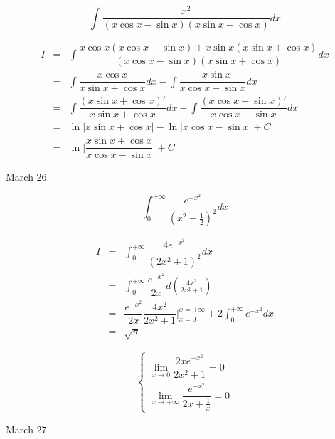 \begin{example}[][Exam: 29.4.8]
	$$\int\dfrac{x^2}{(x\cos x-\sin x)(x\sin x+\cos x)}dx$$
\end{example}

\begin{solution}
	
	\begin{eqnarray*}
		I & = & \int\dfrac{x\cos x(x\cos x-\sin x)+x\sin x(x\sin x+\cos x)}{(x\cos x-\sin x)(x\sin x+\cos x)}dx\\
		  & = & \int \dfrac{x\cos x}{x\sin x+\cos x}dx - \int \dfrac{-x\sin x}{x\cos x-\sin x}dx\\
		  & = & \int \dfrac{(x\sin x+\cos x)'}{x\sin x+\cos x}dx - \int \dfrac{(x\cos x-\sin x)'}{x\cos x-\sin x}dx\\
		  & = & \ln |x\sin x+\cos x| - \ln|x\cos x-\sin x| + C\\
		  & = & \ln \big|\dfrac{x\sin x+\cos x}{x\cos x-\sin x}\big| + C
	\end{eqnarray*}
\end{solution}

\textcolor{purplea}{March 26}

\begin{example}[][Exam: 29.4.9]
	$$\int_{0}^{+\infty}\dfrac{e^{-x^2}}{(x^2+\frac{1}{2})^2}dx$$
\end{example}

\begin{solution}
	
	\begin{eqnarray*}
		I & = & \int_{0}^{+\infty}\dfrac{4e^{-x^2}}{(2x^2+1)^2}dx\\
		  & = & \int_{0}^{+\infty}\dfrac{e^{-x^2}}{2x}d \left(\frac{4x^2}{2x^2+1}\right)\\
		  & = & \dfrac{e^{-x^2}}{2x}\dfrac{4x^2}{2x^2+1}\big|_{x=0}^{x=+\infty} + 2\int_{0}^{+\infty}e^{-x^{2}}dx\\
		  & = & \sqrt{\pi}
	\end{eqnarray*}
	
	$$\begin{cases}
	  \lim\limits_{x \to 0} \dfrac{2xe^{-x^2}}{2x^2+1} = 0\\
	  \lim\limits_{x \to +\infty} \dfrac{e^{-x^2}}{2x+\frac{1}{x}} = 0 
	\end{cases}$$
\end{solution}

\textcolor{purplea}{March 27}

